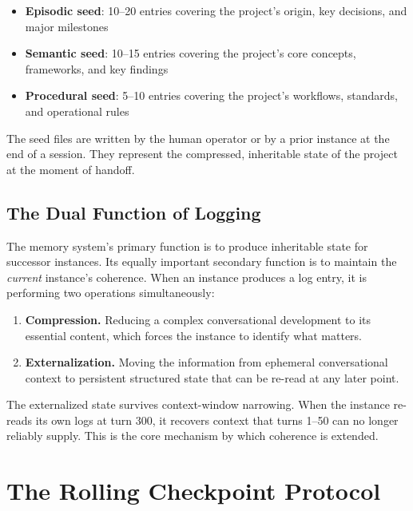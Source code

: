 \documentclass[11pt,a4paper]{article}
\begin{document}
\begin{itemize}[leftmargin=2em]
    \item \textbf{Episodic seed}: 10--20 entries covering the project's origin, key decisions, and major milestones
    \item \textbf{Semantic seed}: 10--15 entries covering the project's core concepts, frameworks, and key findings
    \item \textbf{Procedural seed}: 5--10 entries covering the project's workflows, standards, and operational rules
\end{itemize}

The seed files are written by the human operator or by a prior instance at the end of a session. They represent the compressed, inheritable state of the project at the moment of handoff.

\subsection{The Dual Function of Logging}

The memory system's primary function is to produce inheritable state for successor instances. Its equally important secondary function is to maintain the \textit{current} instance's coherence. When an instance produces a log entry, it is performing two operations simultaneously:

\begin{enumerate}[leftmargin=2em]
    \item \textbf{Compression.} Reducing a complex conversational development to its essential content, which forces the instance to identify what matters.
    \item \textbf{Externalization.} Moving the information from ephemeral conversational context to persistent structured state that can be re-read at any later point.
\end{enumerate}

The externalized state survives context-window narrowing. When the instance re-reads its own logs at turn 300, it recovers context that turns 1--50 can no longer reliably supply. This is the core mechanism by which coherence is extended.


\section{The Rolling Checkpoint Protocol}
\end{document}
